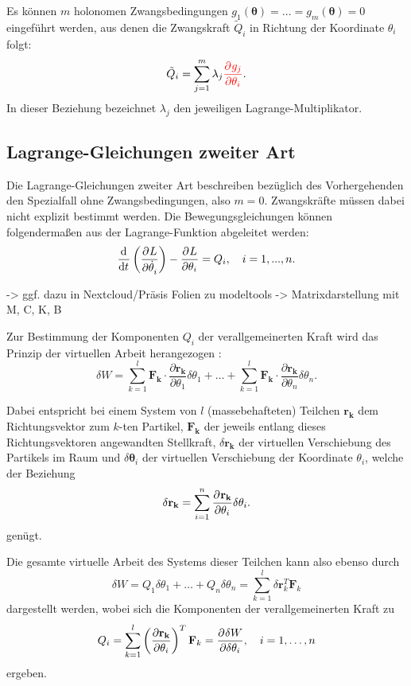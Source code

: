 Es können $m$ holonomen Zwangsbedingungen $g_1(\mathbf{\theta}) = ... = g_m(\mathbf{\theta}) = 0$ eingeführt werden, aus denen die Zwangskraft $\tilde{Q}_i$ in Richtung der Koordinate $\theta_i$ folgt:
\begin{equation}
	\tilde{Q}_i = \sum_{j = 1}^m \lambda_j \textcolor{red}{\frac{\partial^{}g_j}{\partial{\theta_i}^{}}}.
\end{equation}
In dieser Beziehung bezeichnet $\lambda_j$ den jeweiligen Lagrange-Multiplikator.

\subsection{Lagrange-Gleichungen zweiter Art}
\label{sec:Lagrange2_theory}
Die Lagrange-Gleichungen zweiter Art beschreiben bezüglich des Vorhergehenden den Spezialfall ohne Zwangsbedingungen, also $m = 0$. Zwangskräfte müssen dabei nicht explizit bestimmt werden. Die Bewegungsgleichungen können folgendermaßen aus der Lagrange-Funktion abgeleitet werden:
\begin{equation}
	\frac{\mathrm{d}^{}}{\mathrm{d}{t}^{}}\left(\frac{\partial^{}L}{\partial{\dot{\theta}_i}^{}} \right) - \frac{\partial^{}L}{\partial{\theta_i}^{}} = Q_i, \quad i = 1, ..., n.
\end{equation} 

-> ggf. dazu in Nextcloud/Präsis Folien zu modeltools -> Matrixdarstellung mit M, C, K, B

Zur Bestimmung der Komponenten $Q_i$ der verallgemeinerten Kraft wird das Prinzip der virtuellen Arbeit herangezogen \cite{VirtualWork}:
\begin{equation}
	\delta W = \sum_{k=1}^l \mathbf{F_k} \cdot \frac{\partial \mathbf{r_k}}{\partial \theta_1} \delta \theta_1 +\ldots + \sum_{k=1}^l \mathbf{F_k} \cdot \frac{\partial \mathbf{r_k}}{\partial \theta_n} \delta \theta_n.
\end{equation}

Dabei entspricht bei einem System von $l$ (massebehafteten) Teilchen $\mathbf{r_k}$ dem Richtungsvektor zum $k$-ten Partikel, $\mathbf{F_k}$ der jeweils entlang dieses Richtungsvektoren angewandten Stellkraft, $\delta \mathbf{r_{k}}$ der virtuellen Verschiebung des Partikels im Raum und $\delta \mathbf{\theta}_{i}$ der virtuellen Verschiebung der Koordinate $\theta_i$, welche der Beziehung
\begin{equation}
	\delta \mathbf{r_{k}} = \sum_{i = 1}^{n} \frac{\partial^{}\mathbf{r_{k}}}{\partial{\theta_i}^{}} \delta \theta_i.
\end{equation}
genügt.

Die gesamte virtuelle Arbeit des Systems dieser Teilchen kann also ebenso durch
\begin{equation}
\label{eq:virtual_work}
\delta W = Q_1 \delta \theta_1 + \ldots + Q_n\delta \theta_n = \sum_{k=1}^{l}\delta \mathbf{r}_k^T \mathbf{F}_k
\end{equation}
dargestellt werden, wobei sich die Komponenten der verallgemeinerten Kraft zu
\begin{equation}
\label{eq:virtual_work_force}
Q_i = \sum_{k=1}^l \left(\frac {\partial \mathbf{r_k}} {\partial \theta_i} \right)^T \mathbf {F}_{k} = \frac{\partial^{}\delta W}{\partial{\delta \theta_i}^{}} ,\quad i=1,\ldots, n 
\end{equation}
ergeben.
